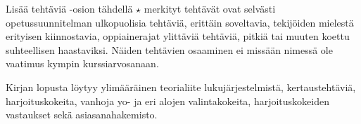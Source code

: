 Lisää tehtäviä -osion tähdellä $\star$ merkityt tehtävät ovat selvästi opetussuunnitelman ulkopuolisia tehtäviä, erittäin soveltavia, tekijöiden mielestä erityisen kiinnostavia, oppiainerajat ylittäviä tehtäviä, pitkiä tai muuten koettu suhteellisen haastaviksi. Näiden tehtävien osaaminen ei missään nimessä ole vaatimus kympin kurssiarvosanaan.

Kirjan lopusta löytyy ylimääräinen teorialiite lukujärjestelmistä, kertaustehtäviä, harjoituskokeita, vanhoja yo- ja eri alojen valintakokeita, harjoituskokeiden vastaukset sekä asiasanahakemisto.

\newpage
